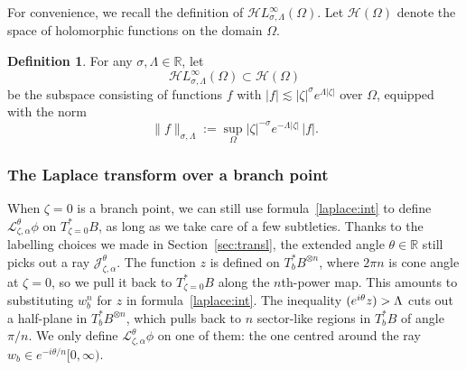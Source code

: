 \documentclass{article}
\let\Re\relax
\DeclareMathOperator{\Re}{Re}
\newcommand{\holo}{\mathcal{H}}
\newcommand{\singexp}[2]{\mathcal{H}L^\infty_{#1, #2}}
\newcommand{\R}{\mathbb{R}}
\newcommand{\laplace}{\mathcal{L}}
\theoremstyle{definition}
\newtheorem{definition}{Definition}[section]
\theoremstyle{plain}
\begin{document}
For convenience, we recall the definition of $\singexp{\sigma}{\Lambda}(\Omega)$. Let $\holo(\Omega)$ denote the space of holomorphic functions on the domain $\Omega$. 
\begin{definition}\label{def:HL_inf}
For any $\sigma, \Lambda \in \R$, let
\[ \singexp{\sigma}{\Lambda}(\Omega) \subset \holo(\Omega) \]
be the subspace consisting of functions $f$ with $|f| \lesssim |\zeta|^\sigma e^{\Lambda|\zeta|}$ over $\Omega$, equipped with the norm
\[ \|f\|_{\sigma,\Lambda} := \sup_\Omega |\zeta|^{-\sigma} e^{-\Lambda|\zeta|}\,|f|. \]       
\end{definition}
\subsubsection{The Laplace transform over a branch point}
When $\zeta = 0$ is a branch point, we can still use formula~\eqref{laplace:int} to define $\laplace_{\zeta, \alpha}^\theta \phi$ on $T_{\zeta = 0}^*B$, as long as we take care of a few subtleties. Thanks to the labelling choices we made in Section~\ref{sec:transl}, the extended angle $\theta \in \R$ still picks out a ray $\mathcal{J}_{\zeta, \alpha}^\theta$. The function $z$ is defined on $T_b^*B^{\otimes n}$, where $2\pi n$ is cone angle at $\zeta = 0$, so we pull it back to $T^*_{\zeta = 0} B$ along the $n$th-power map. This amounts to substituting $w_b^n$ for $z$ in formula~\eqref{laplace:int}. The inequality $\Re(e^{i\theta} z) > \Lambda$ cuts out a half-plane in $T_b^*B^{\otimes n}$, which pulls back to $n$ sector-like regions in $T_b^*B$ of angle $\pi/n$. We only define $\laplace_{\zeta, \alpha}^\theta \phi$ on one of them: the one centred around the ray $w_b \in e^{-i\theta/n}[0, \infty)$.
\end{document}
